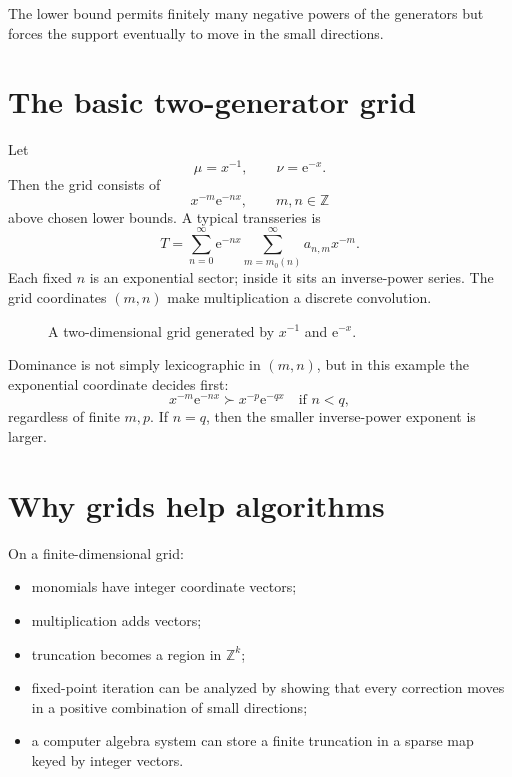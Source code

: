 \documentclass[11pt,openany]{book}
\theoremstyle{definition}
\theoremstyle{plain}
\theoremstyle{remark}
\newcommand{\Z}{\mathbb{Z}}
\newcommand{\e}{\mathrm{e}}
\newcommand{\succdom}{\succ}
\begin{document}
The lower bound permits finitely many negative powers of the generators but forces the support eventually to move in the small directions.

\section{The basic two-generator grid}

Let
\[
 \mu=x^{-1},
 \qquad
 \nu=\e^{-x}.
\]
Then the grid consists of
\[
 x^{-m}\e^{-nx},
 \qquad m,n\in\Z
\]
above chosen lower bounds. A typical transseries is
\begin{equation}\label{eq:two-grid-series}
 T=\sum_{n=0}^{\infty}\e^{-nx}
   \sum_{m=m_0(n)}^{\infty}a_{n,m}x^{-m}.
\end{equation}
Each fixed $n$ is an exponential sector; inside it sits an inverse-power series. The grid coordinates $(m,n)$ make multiplication a discrete convolution.

\begin{figure}[htbp]
\centering
{}
\caption{A two-dimensional grid generated by $x^{-1}$ and $\e^{-x}$.}
\label{fig:two-dimensional-grid}
\end{figure}

Dominance is not simply lexicographic in $(m,n)$, but in this example the exponential coordinate decides first:
\[
 x^{-m}\e^{-nx}\succdom x^{-p}\e^{-qx}
 \quad\text{if }n<q,
\]
regardless of finite $m,p$. If $n=q$, then the smaller inverse-power exponent is larger.

\section{Why grids help algorithms}

On a finite-dimensional grid:

\begin{itemize}
\item monomials have integer coordinate vectors;
\item multiplication adds vectors;
\item truncation becomes a region in $\Z^k$;
\item fixed-point iteration can be analyzed by showing that every correction moves in a positive combination of small directions;
\item a computer algebra system can store a finite truncation in a sparse map keyed by integer vectors.
\end{itemize}
\end{document}

